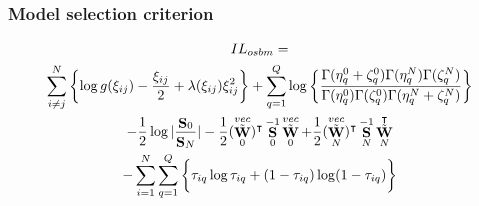 \documentclass{beamer}
\newcommand{\argmax}{\mathrm{argmax}}
\DeclareMathOperator{\covmat}{{\bf S}}
\DeclareMathOperator{\bX}{{\bf X}}
\DeclareMathOperator{\bW}{{\bf W}}
\DeclareMathOperator{\btW}{\tilde{\bW}}
\DeclareMathOperator{\Beta}{Beta}
\DeclareMathOperator{\Bernoulli}{\mathcal{B}}
\DeclareMathOperator{\LowerBound}{\mathcal{L}}
\DeclareMathOperator{\balpha}{\boldsymbol{\alpha}}
\DeclareMathOperator{\bxi}{\boldsymbol{\xi}}
\begin{document}


  



\begin{frame}\frametitle{Model selection criterion}
 
    \begin{multline*}
      IL_{osbm} = \\\sum_{i\neq j}^{N} \left\{\log g(\xi_{ij}) - \frac{\xi_{ij}}{2} + \lambda(\xi_{ij})\xi_{ij}^{2}\right\} + \sum_{q=1}^{Q}\log \bigg\{\frac{\Gamma(\eta_{q}^{0}+\zeta_{q}^{0})\Gamma(\eta_{q}^{N})\Gamma(\zeta_{q}^{N})}{\Gamma(\eta_{q}^{0})\Gamma(\zeta_{q}^{0})\Gamma(\eta_{q}^{N}+\zeta_{q}^{N})}\bigg\} \\
      -\frac{1}{2}\log |\frac{\covmat_{0}}{\covmat_{N}}| - \frac{1}{2}(\btW_{0}^{vec})^{\intercal}\covmat_{0}^{-1}\btW_{0}^{vec} + \frac{1}{2}(\btW_{N}^{vec})^{\intercal}\covmat_{N}^{-1}\btW_{N}^{\intercal} \\
      - \sum_{i=1}^{N}\sum_{q=1}^{Q}\bigg\{\tau_{iq}\log\tau_{iq} + (1-\tau_{iq})\log(1-\tau_{iq})\bigg\}
    \end{multline*}
 
\end{frame}
\end{document}
